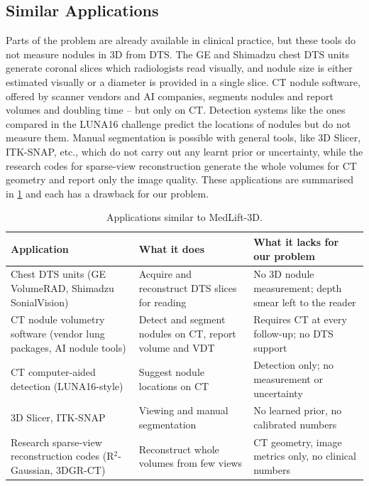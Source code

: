 \subsection{Similar Applications}

Parts of the problem are already available in clinical practice, but these tools do not measure nodules in 3D from DTS. The GE and Shimadzu chest DTS units generate coronal slices which radiologists read visually, and nodule size is either estimated visually or a diameter is provided in a single slice. CT nodule software, offered by scanner vendors and AI companies, segments nodules and report volumes and doubling time -- but only on CT. Detection systems like the ones compared in the LUNA16 challenge predict the locations of nodules but do not measure them. Manual segmentation is possible with general tools, like 3D Slicer, ITK-SNAP, etc., which do not carry out any learnt prior or uncertainty, while the research codes for sparse-view reconstruction generate the whole volumes for CT geometry and report only the image quality. These applications are summarised in \cref{tab:similar} and each has a drawback for our problem.

\begin{table}[!htbp]
\centering\small
\caption{Applications similar to MedLift-3D.}
\label{tab:similar}
\begin{tabularx}{\linewidth}{>{\raggedright\arraybackslash}p{3.6cm} >{\raggedright\arraybackslash}X >{\raggedright\arraybackslash}X}
\toprule
Application & What it does & What it lacks for our problem \\
\midrule
Chest DTS units (GE VolumeRAD, Shimadzu SonialVision) & Acquire and reconstruct DTS slices for reading & No 3D nodule measurement; depth smear left to the reader \\
CT nodule volumetry software (vendor lung packages, AI nodule tools) & Detect and segment nodules on CT, report volume and VDT & Requires CT at every follow-up; no DTS support \\
CT computer-aided detection (LUNA16-style)~\cite{setio2017luna} & Suggest nodule locations on CT & Detection only; no measurement or uncertainty \\
3D Slicer, ITK-SNAP & Viewing and manual segmentation & No learned prior, no calibrated numbers \\
Research sparse-view reconstruction codes (R$^2$-Gaussian, 3DGR-CT)~\cite{zha2024r2,li2025gr} & Reconstruct whole volumes from few views & CT geometry, image metrics only, no clinical numbers \\
\bottomrule
\end{tabularx}
\end{table}

